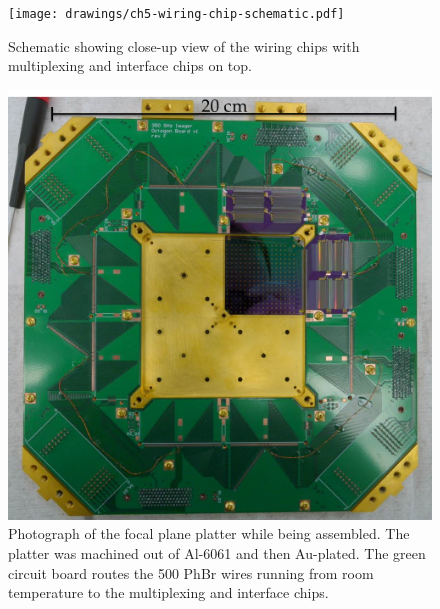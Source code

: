 \begin{figure}
\centering
\texttt{[image: drawings/ch5-wiring-chip-schematic.pdf]}
\caption{
  Schematic showing close-up view of the wiring chips with multiplexing and interface chips on top.
}
\label{fig:ch5-wiring-chip-schematic}
\end{figure}

\begin{figure}
\centering
\includegraphics[width=6.00in]{images/ch5-focal-plane-platter.jpg}
\caption{
  Photograph of the focal plane platter while being assembled.
  The platter was machined out of Al-6061 and then Au-plated.
  The green circuit board routes the 500 PhBr wires running from room temperature to the multiplexing and interface chips.
}
\label{fig:ch5-focal-plane-platter}
\end{figure}
